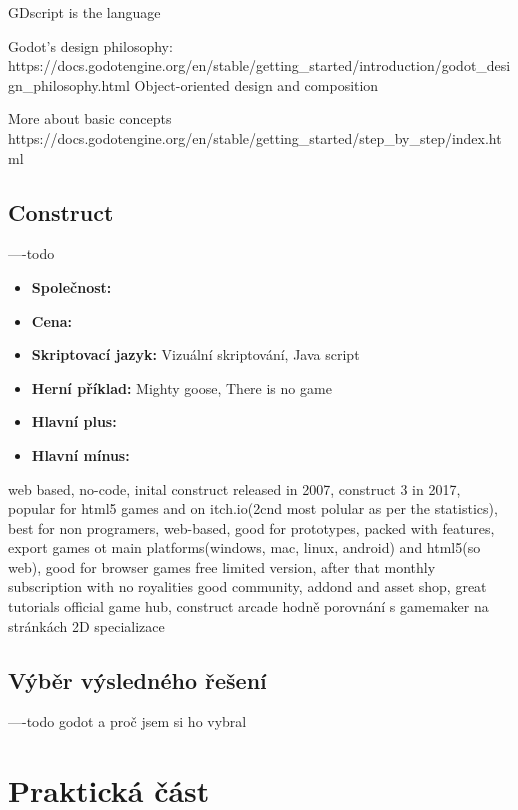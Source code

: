 GDscript is the language

Godot's design philosophy:
https://docs.godotengine.org/en/stable/getting\_started/introduction/godot\_design\_philosophy.html
Object-oriented design and composition

More about basic concepts
https://docs.godotengine.org/en/stable/getting\_started/step\_by\_step/index.html

\subsection{Construct}
----todo \linebreak
{}

\begin{itemize}
	\item \textbf{Společnost: }
	\item \textbf{Cena: }
	\item \textbf{Skriptovací jazyk: }  Vizuální skriptování, Java script
	\item \textbf{Herní příklad: } Mighty goose, There is no game
	\item \textbf{Hlavní plus: }
	\item \textbf{Hlavní mínus: }
\end{itemize}

web based, no-code, inital construct released in 2007, construct 3 in 2017, popular for html5 games and on itch.io(2cnd most polular as per the statistics\cite{itch_io_engines}),
best for non programers, web-based, good for prototypes, packed with features, export games ot main platforms(windows, mac, linux, android) and html5(so web), good for browser games
free limited version, after that monthly subscription with no royalities
good community, addond and asset shop, great tutorials
official game hub, construct arcade
hodně porovnání s gamemaker na stránkách
2D specializace


\subsection{Výběr výsledného řešení}
----todo \linebreak godot a proč jsem si ho vybral


\section{Praktická část}

